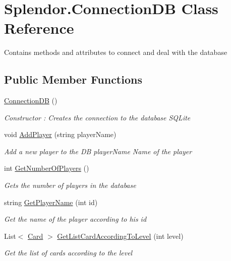 \hypertarget{class_splendor_1_1_connection_d_b}{}\section{Splendor.\+Connection\+DB Class Reference}
\label{class_splendor_1_1_connection_d_b}


Contains methods and attributes to connect and deal with the database  


\subsection*{Public Member Functions}
\begin{DoxyCompactItemize}
\item 
\hyperlink{class_splendor_1_1_connection_d_b_aaaa5c66d4f12702d36a76dd21beb62c4}{Connection\+DB} ()
\begin{DoxyCompactList}\small\item\em Constructor \+: Creates the connection to the database S\+Q\+Lite \end{DoxyCompactList}\item 
void \hyperlink{class_splendor_1_1_connection_d_b_a122fc944f46910732f429432c0f80ec3}{Add\+Player} (string player\+Name)
\begin{DoxyCompactList}\small\item\em Add a new player to the DB {\itshape player\+Name} Name of the player \end{DoxyCompactList}\item 
int \hyperlink{class_splendor_1_1_connection_d_b_a5731b9d427109c1d15db9665f290bf9a}{Get\+Number\+Of\+Players} ()
\begin{DoxyCompactList}\small\item\em Gets the number of players in the database \end{DoxyCompactList}\item 
string \hyperlink{class_splendor_1_1_connection_d_b_a7d715d5452049ad06f4a407fa5df151c}{Get\+Player\+Name} (int id)
\begin{DoxyCompactList}\small\item\em Get the name of the player according to his id \end{DoxyCompactList}\item 
List$<$ \hyperlink{class_splendor_1_1_card}{Card} $>$ \hyperlink{class_splendor_1_1_connection_d_b_aedda6930c46d2667248333ffca06882a}{Get\+List\+Card\+According\+To\+Level} (int level)
\begin{DoxyCompactList}\small\item\em Get the list of cards according to the level \end{DoxyCompactList}\item 

\end{DoxyCompactItemize}
